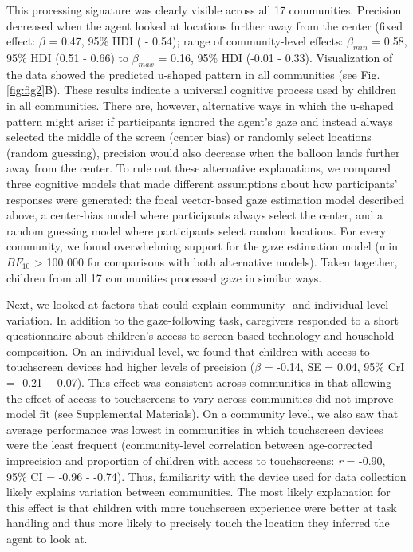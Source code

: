 \documentclass[
  man,floatsintext]{apa6}
\begin{document}
This processing signature was clearly visible across all 17 communities. Precision decreased when the agent looked at locations further away from the center (fixed effect: \(\beta\) = 0.47, 95\% HDI ( - 0.54); range of community-level effects: \(\beta_{min}\) = 0.58, 95\% HDI (0.51 - 0.66) to \(\beta_{max}\) = 0.16, 95\% HDI (-0.01 - 0.33). Visualization of the data showed the predicted u-shaped pattern in all communities (see Fig. \ref{fig:fig2}B). These results indicate a universal cognitive process used by children in all communities. There are, however, alternative ways in which the u-shaped pattern might arise: if participants ignored the agent's gaze and instead always selected the middle of the screen (center bias) or randomly select locations (random guessing), precision would also decrease when the balloon lands further away from the center. To rule out these alternative explanations, we compared three cognitive models that made different assumptions about how participants' responses were generated: the focal vector-based gaze estimation model described above, a center-bias model where participants always select the center, and a random guessing model where participants select random locations. For every community, we found overwhelming support for the gaze estimation model (min \(BF_{10}\) \textgreater{} 100 000 for comparisons with both alternative models). Taken together, children from all 17 communities processed gaze in similar ways.

Next, we looked at factors that could explain community- and individual-level variation. In addition to the gaze-following task, caregivers responded to a short questionnaire about children's access to screen-based technology and household composition. On an individual level, we found that children with access to touchscreen devices had higher levels of precision (\(\beta\) = -0.14, SE = 0.04, 95\% CrI = -0.21 - -0.07). This effect was consistent across communities in that allowing the effect of access to touchscreens to vary across communities did not improve model fit (see Supplemental Materials). On a community level, we also saw that average performance was lowest in communities in which touchscreen devices were the least frequent (community-level correlation between age-corrected imprecision and proportion of children with access to touchscreens: \emph{r} = -0.90, 95\% CI = -0.96 - -0.74). Thus, familiarity with the device used for data collection likely explains variation between communities. The most likely explanation for this effect is that children with more touchscreen experience were better at task handling and thus more likely to precisely touch the location they inferred the agent to look at.
\end{document}
